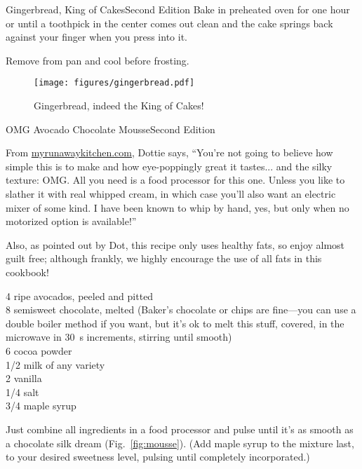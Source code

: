 \begin{entry}{Gingerbread, King of Cakes}{Second Edition}
Bake in preheated oven for one hour or until a toothpick in the center comes out
clean and the cake springs back against your finger when you press into it.

Remove from pan and cool before frosting.
\begin{figure}[h]
    \centering
    \texttt{[image: figures/gingerbread.pdf]}
    \caption{Gingerbread, indeed the King of Cakes!}
\end{figure}
\end{entry}

\begin{entry}{OMG Avocado Chocolate Mousse}{Second Edition}

\begin{open}
  From \url{myrunawaykitchen.com}, Dottie says, ``You're not going to believe
  how simple this is to make and how eye-poppingly great it tastes... and the
  silky texture: OMG.  All you need is a food processor for this one.  Unless
  you like to slather it with real whipped cream, in which case you'll also
  want an electric mixer of some kind.  I have been known to whip by hand,
  yes, but only when no motorized option is available!''

  Also, as pointed out by Dot, this recipe only uses healthy fats, so enjoy
  almost guilt free; although frankly, we highly encourage the use of all fats
  in this cookbook!
\end{open}
\begin{ingredients}
    4 ripe avocados, peeled and pitted\\
    \SI{8}{\ounce} semisweet chocolate, melted (Baker's chocolate or chips are fine---you can use a double boiler method if you want, but it's ok to melt this stuff, covered, in the microwave in \SI{30}{\second} increments, stirring until smooth)\\
    \SI{6}{\tblspoon} cocoa powder\\
    \SI{1/2}{\cup} milk of any variety\\
    \SI{2}{\teaspoon} vanilla\\
    \SI{1/4}{\teaspoon} salt\\
    \SI{3/4}{\cup} maple syrup
\end{ingredients}
Just combine all ingredients in a food processor and pulse until it's as smooth
as a chocolate silk dream (Fig.~\ref{fig:mousse}).  (Add maple syrup to the
mixture last, to your desired sweetness level, pulsing until completely
incorporated.)


\end{entry}
